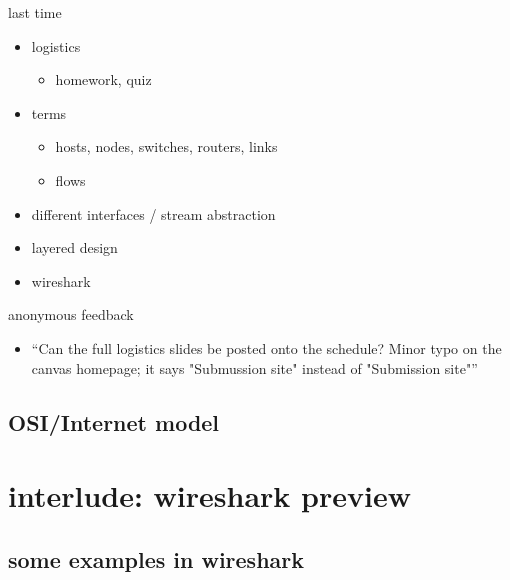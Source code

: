 \date{}
\title{}
\date{}
\usepackage{pgfplots}
\pgfplotsset{compat=1.16}

\begin{frame}
    \titlepage
\end{frame}



\begin{frame}{last time}
    \begin{itemize}
    \item logistics
        \begin{itemize}
        \item homework, quiz
        \end{itemize}
    \item terms
        \begin{itemize}
        \item hosts, nodes, switches, routers, links
        \item flows
        \end{itemize}
    \item different interfaces / stream abstraction
    \item layered design
    \item wireshark
    \end{itemize}
\end{frame}

\begin{frame}{anonymous feedback}
    \begin{itemize}
    \item ``Can the full logistics slides be posted onto the schedule? Minor typo on the canvas homepage; it says "Submussion site" instead of "Submission site"''
    \end{itemize}
\end{frame}

\subsection{OSI/Internet model}




\section{interlude: wireshark preview}



\subsection{some examples in wireshark}




